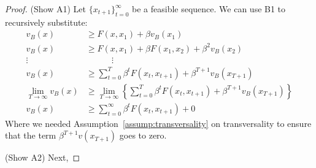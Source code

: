 \documentclass[12pt]{article}
\numberwithin{equation}{section} %
\theoremstyle{plain}
\theoremstyle{definition}
\theoremstyle{remark}
\newcommand{\sumtTz}{\sum^T_{t=0}}
\newcommand{\sumtinfz}{\sum^\infty_{t=0}}
\begin{document}
\begin{proof}
(Show A1) Let $\{x_{t+1}\}_{t=0}^\infty$ be a feasible sequence. We can
use B1 to recursively substitute:
\begin{align*}
  v_B(x) &\geq F(x,x_1) + \beta v_B(x_1) \\
  v_B(x) &\geq F(x,x_1) + \beta F(x_1, x_2) + \beta^2 v_B(x_2) \\
  \vdots \quad & \quad \qquad \vdots \\
  v_B(x) &\geq \sumtTz \beta^t F(x_t,x_{t+1}) + \beta^{T+1} v_B(x_{T+1}) \\
  \lim_{T\rightarrow\infty}
  v_B(x) &\geq
    \lim_{T\rightarrow\infty}
    \left\{
    \sumtTz \beta^t F(x_t,x_{t+1}) + \beta^{T+1} v_B(x_{T+1})
    \right\}\\
  v_B(x) &\geq
    \sumtinfz \beta^t F(x_t,x_{t+1})
    + 0
\end{align*}
Where we needed Assumption~\ref{assump:transversality} on transversality
to ensure that the term $\beta^{T+1}v(x_{T+1})$ goes to zero.

(Show A2) Next,
\end{proof}
\end{document}
